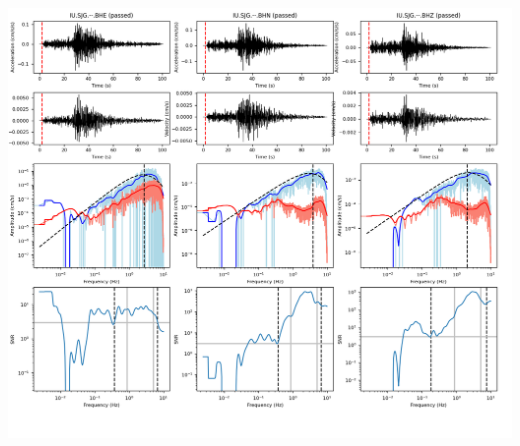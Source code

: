 \documentclass[9pt]{article}
\begin{document}
\includegraphics[height=5.75in]
    {plots/19931108034521_IU.SJG.BH.png}
\end{document}
